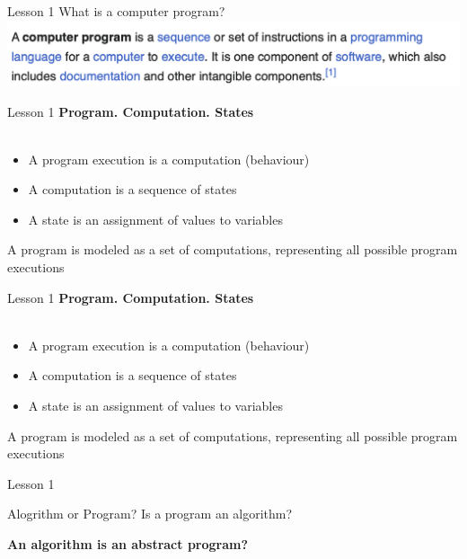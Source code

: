 \documentclass[aspectratio=1610]{beamer}
\begin{document}
\begin{frame}{Lesson 1}{}
{\Huge{What is a computer program?}}
\includegraphics[scale=0.67]{Images/program}
\end{frame}

\begin{frame}{Lesson 1}{}
\Large
\textbf{Program. Computation. States}\\~\\

\Large{
\begin{itemize}
    \item A program execution is a computation (behaviour)
    \item A computation is a sequence of states    
    \item A state is an assignment of values to variables
\end{itemize}}

\Large {A program is modeled as a set of computations, representing all possible program executions}
\end{frame}



\begin{frame}{Lesson 1}{}
\Large
\textbf{Program. Computation. States}\\~\\

\Large{
\begin{itemize}
    \item A program execution is a computation (behaviour)
    \item A computation is a sequence of states    
    \item A state is an assignment of values to variables
\end{itemize}}

\Large {A program is modeled as a set of computations, representing all possible program executions}
\end{frame}





\begin{frame}{Lesson 1}{}

{\Huge{Alogrithm or Program? Is a program an algorithm?}}

\Large
\textbf{An algorithm is an abstract program?}\\~\\


\end{frame}
\end{document}
